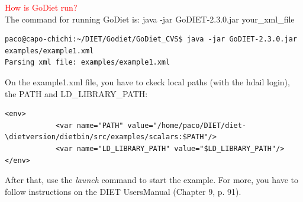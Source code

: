 \documentclass[12pt,a4paper]{book}
\newcommand{\dietversion}{2.5}
\begin{document}
\noindent \textcolor{red}{How is GoDiet run?}\\
\noindent The command for running GoDiet is: java -jar GoDIET-2.3.0.jar your\_xml\_file
\begin{verbatim}
paco@capo-chichi:~/DIET/Godiet/GoDiet_CVS$ java -jar GoDIET-2.3.0.jar examples/example1.xml
Parsing xml file: examples/example1.xml
\end{verbatim}

\noindent On the example1.xml file, you have to ckeck local paths (with the hdail login), the PATH and LD\_LIBRARY\_PATH:

\begin{verbatim}
<env>
		    <var name="PATH" value="/home/paco/DIET/diet-\dietversion/dietbin/src/examples/scalars:$PATH"/>
		    <var name="LD_LIBRARY_PATH" value="$LD_LIBRARY_PATH"/>
</env>
\end{verbatim}

\noindent After that, use the \textit {launch} command to start the example. For more, you have to follow instructions on the DIET UsersManual (Chapter 9, p. 91).
\end{document}
